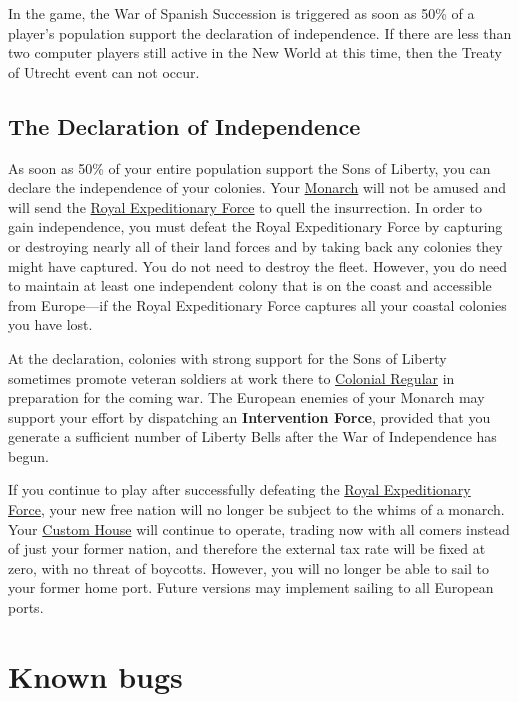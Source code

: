\documentclass[12pt]{book}
\newcommand{\Concept}[1]{\index{#1}\hypertarget{#1}{\textbf{#1}}}
\begin{document}
In the game, the War of Spanish Succession is triggered as soon as
50\% of a player's population support the declaration of independence.
If there are less than two computer players still active in the New
World at this time, then the Treaty of Utrecht event can not occur.


\hypertarget{Declaration of Independence}{\section{The Declaration
of Independence}}

As soon as 50\% of your entire population support the Sons of Liberty,
you can declare the independence of your colonies. Your
\hyperlink{Monarch}{Monarch} will not be amused and will send the
\hyperlink{Royal Expeditionary Force}{Royal Expeditionary Force} to
quell the insurrection. In order to gain independence, you must defeat
the Royal Expeditionary Force by capturing or destroying nearly all of
their land forces and by taking back any colonies they might have
captured. You do not need to destroy the fleet. However, you do need
to maintain at least one independent colony that is on the coast and
accessible from Europe---if the Royal Expeditionary Force captures
all your coastal colonies you have lost.

At the declaration, colonies with strong support for the Sons of
Liberty sometimes promote veteran soldiers at work there to
\hyperlink{Colonial Regular}{Colonial Regular} in preparation for the
coming war. The European enemies of your Monarch may support your
effort by dispatching an \Concept{Intervention Force}, provided that
you generate a sufficient number of Liberty Bells after the War of
Independence has begun.

If you continue to play after successfully defeating the
\hyperlink{Royal Expeditionary Force}{Royal Expeditionary Force}, your
new free nation will no longer be subject to the whims of a monarch.
Your \hyperlink{Custom House}{Custom House} will continue to operate,
trading now with all comers instead of just your former nation, and
therefore the external tax rate will be fixed at zero, with no threat of
boycotts. However, you will no longer be able to sail to your former
home port. Future versions may implement sailing to all European ports.



\hypertarget{Known bugs}{\chapter{Known bugs}}
\end{document}
